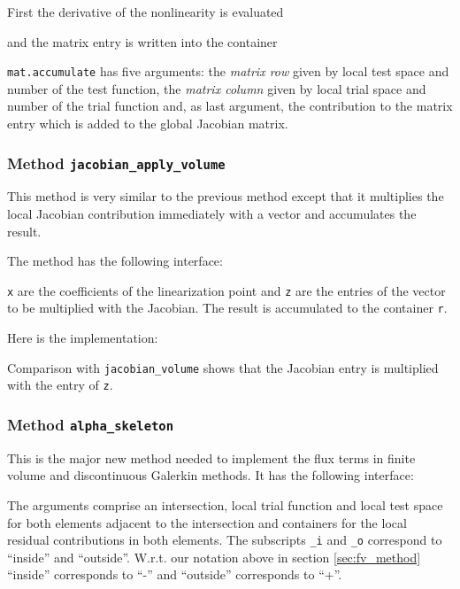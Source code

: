 \documentclass[a4paper,12pt]{article}
\begin{document}
First the derivative of the nonlinearity is evaluated

and the matrix entry is written into the container

\lstinline{mat.accumulate} has five arguments:
the \textit{matrix row} given by local test space and number of the
test function, the \textit{matrix column} given by local trial space and
number of the trial function and, as last argument, the contribution to
the matrix entry which is added to the global Jacobian matrix.

\subsubsection*{Method \lstinline{jacobian_apply_volume}}

This method is very similar to the previous method except that
it multiplies the local Jacobian contribution immediately with a vector
and accumulates the result.

The method has the following interface:

\lstinline{x} are the coefficients of the linearization point and
\lstinline{z} are the entries of the vector to be multiplied with the
Jacobian. The result is accumulated to the container \lstinline{r}.

Here is the implementation:

Comparison with \lstinline{jacobian_volume} shows that
the Jacobian entry is multiplied with the entry of \lstinline{z}.

\subsubsection*{Method \lstinline{alpha_skeleton}}

This is the major new method needed to implement the flux terms
in finite volume and discontinuous Galerkin methods. It
has the following interface:

The arguments comprise an intersection, local trial function
and local test space for both elements adjacent to the intersection
and containers for the local residual contributions in both elements.
The subscripts \lstinline{_i} and \lstinline{_o} correspond to
``inside'' and ``outside''. W.r.t. our notation above in section \ref{sec:fv_method}
``inside'' corresponds to ``-'' and ``outside'' corresponds to ``+''.
\end{document}

